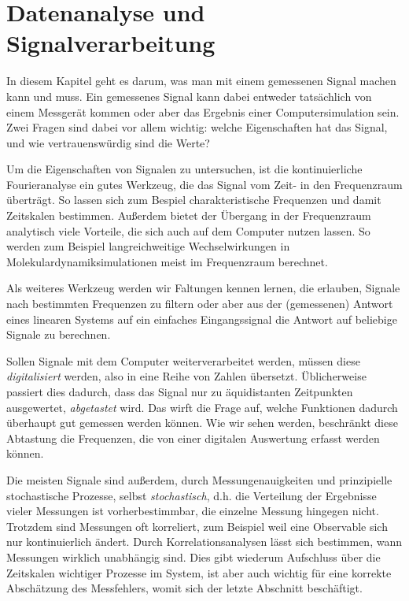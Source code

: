 % 

\chapter{Datenanalyse und Signalverarbeitung}

In diesem Kapitel geht es darum, was man mit einem gemessenen Signal
machen kann und muss. Ein gemessenes Signal kann dabei entweder
tatsächlich von einem Messgerät kommen oder aber das Ergebnis einer
Computersimulation sein. Zwei Fragen sind dabei vor allem wichtig:
welche Eigenschaften hat das Signal, und wie vertrauenswürdig sind die
Werte?

Um die Eigenschaften von Signalen zu untersuchen, ist die
kontinuierliche Fourieranalyse ein gutes Werkzeug, die das Signal vom
Zeit- in den Frequenzraum überträgt. So lassen sich zum Bespiel
charakteristische Frequenzen und damit Zeitskalen bestimmen. Außerdem
bietet der Übergang in der Frequenzraum analytisch viele Vorteile, die
sich auch auf dem Computer nutzen lassen. So werden zum Beispiel
langreichweitige Wechselwirkungen in Molekulardynamiksimulationen
meist im Frequenzraum berechnet.

Als weiteres Werkzeug werden wir Faltungen kennen lernen, die
erlauben, Signale nach bestimmten Frequenzen zu filtern oder aber aus
der (gemessenen) Antwort eines linearen Systems auf ein einfaches
Eingangssignal die Antwort auf beliebige Signale zu berechnen.

Sollen Signale mit dem Computer weiterverarbeitet werden, müssen diese
\emph{digitalisiert} werden, also in eine Reihe von Zahlen
übersetzt. Üblicherweise passiert dies dadurch, dass das Signal nur zu
äquidistanten Zeitpunkten ausgewertet, \emph{abgetastet} wird. Das
wirft die Frage auf, welche Funktionen dadurch überhaupt gut gemessen
werden können. Wie wir sehen werden, beschränkt diese Abtastung die
Frequenzen, die von einer digitalen Auswertung erfasst werden können.

Die meisten Signale sind außerdem, durch Messungenauigkeiten und
prinzipielle stochastische Prozesse, selbst \emph{stochastisch},
d.h. die Verteilung der Ergebnisse vieler Messungen ist
vorherbestimmbar, die einzelne Messung hingegen nicht. Trotzdem sind
Messungen oft korreliert, zum Beispiel weil eine Observable sich nur
kontinuierlich ändert.  Durch Korrelationsanalysen lässt sich
bestimmen, wann Messungen wirklich unabhängig sind. Dies gibt wiederum
Aufschluss über die Zeitskalen wichtiger Prozesse im System, ist aber
auch wichtig für eine korrekte Abschätzung des Messfehlers, womit sich
der letzte Abschnitt beschäftigt.

